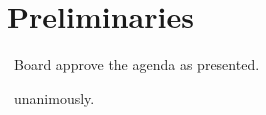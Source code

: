 \section*{Preliminaries}

\begin{information}
\end{information}

\begin{motion}
    \birt\ Board approve the agenda as presented.
    \movers{\elizabeth}{\andrewc}

    \carries\ unanimously.
\end{motion}
